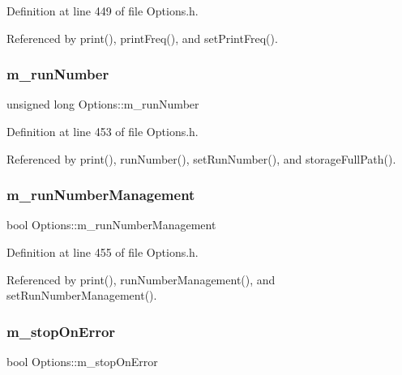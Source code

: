 Definition at line 449 of file Options.\+h.



Referenced by print(), print\+Freq(), and set\+Print\+Freq().

\mbox{\label{classOptions_a1762c644c5f87feabe12f84f17a1a351}} 
\subsubsection{\texorpdfstring{m\+\_\+run\+Number}{m\_runNumber}}
{\footnotesize\ttfamily unsigned long Options\+::m\+\_\+run\+Number\hspace{0.3cm}{\ttfamily [private]}}



Definition at line 453 of file Options.\+h.



Referenced by print(), run\+Number(), set\+Run\+Number(), and storage\+Full\+Path().

\mbox{\label{classOptions_a2ad2d67b98fc5fbea4cbbd781ccb6183}} 
\subsubsection{\texorpdfstring{m\+\_\+run\+Number\+Management}{m\_runNumberManagement}}
{\footnotesize\ttfamily bool Options\+::m\+\_\+run\+Number\+Management\hspace{0.3cm}{\ttfamily [private]}}



Definition at line 455 of file Options.\+h.



Referenced by print(), run\+Number\+Management(), and set\+Run\+Number\+Management().

\mbox{\label{classOptions_a879c2741a290595adb3f74633f3a3987}} 
\subsubsection{\texorpdfstring{m\+\_\+stop\+On\+Error}{m\_stopOnError}}
{\footnotesize\ttfamily bool Options\+::m\+\_\+stop\+On\+Error\hspace{0.3cm}{\ttfamily [private]}}



